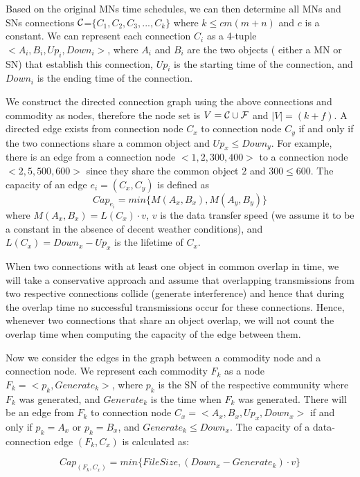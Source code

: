 \documentclass[conference]{IEEEtran}
\begin{document}
{Based on the original MNs time schedules, we can then determine all MNs and SNs connections $\cal C$=$\{C_1,C_2,C_3, ... ,C_k\}$ where $k \leq cm(m+n)$ and $c$ is a constant. We can represent each connection $C_i$ as a 4-tuple $<A_i, B_i, Up_i, Down_i>$, where $A_i$ and $B_i$ are the two objects ( either a MN or SN) that establish this connection, $Up_i$ is the starting time of the connection, and $Down_i$ is the ending time of the connection.

We construct the directed connection graph using the above connections and commodity as nodes, therefore the node set is $V = {\cal C} \cup {\cal F}$ and $|V|=(k+f)$. A directed edge exists from connection node $C_x$ to connection node $C_y$ if and only if the two connections share a common object and $Up_x \le Down_y$. For example, there is an edge from a connection node $<1, 2, 300, 400>$ to a connection node $<2, 5, 500, 600>$ since they share the common object $2$ and $300 \le 600$. The capacity of an edge $e_i=(C_x,C_y)$ is defined as
\begin{equation}
	Cap_{e_i} = min\{M(A_x,B_x),M(A_y,B_y)\}
\end{equation}
where $M(A_x,B_x) = L(C_x) \cdot v$,  $v$ is the data transfer speed (we assume it to be a constant in the absence of decent weather conditions), and $L(C_x)=Down_x-Up_x$ is the lifetime of $C_x$. 

When two connections with at least one object in common overlap in time, we will take a conservative approach and assume that overlapping transmissions from two respective connections collide (generate interference) and hence that during the overlap time no successful transmissions occur for these connections. Hence, whenever two connections that share an object overlap, we will not count the overlap time when computing the capacity of the edge between them.

Now we consider the edges in the graph between a commodity node and a connection node. We represent each commodity $F_k$ as a node $F_k=<p_k,Generate_k>$, where $p_k$ is the SN of the respective community where $F_k$ was generated, and $Generate_k$ is the time when $F_k$  was generated. There will be an edge from $F_k$ to connection node $C_x=<A_x, B_x, Up_x, Down_x>$ if and only if $p_k = A_x$ or $p_k = B_x$, and $Generate_k \leq Down_x$. The capacity of a data-connection edge $(F_k,C_x)$ is calculated as:

\begin{equation}
	Cap_{(F_k,C_x)} = min \{FileSize, (Down_x-Generate_k )\cdot v\}
\end{equation}

}
\end{document}
